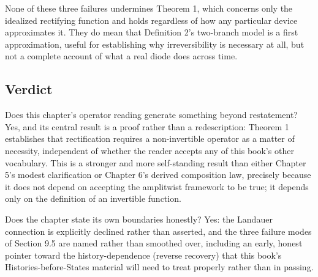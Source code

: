 \documentclass[12pt]{article}
\begin{document}
None of these three failures undermines Theorem 1, which concerns only the idealized rectifying function and holds regardless of how any particular device approximates it. They do mean that Definition 2's two-branch model is a first approximation, useful for establishing why irreversibility is necessary at all, but not a complete account of what a real diode does across time.

\subsection{Verdict}

Does this chapter's operator reading generate something beyond restatement? Yes, and its central result is a proof rather than a redescription: Theorem 1 establishes that rectification requires a non-invertible operator as a matter of necessity, independent of whether the reader accepts any of this book's other vocabulary. This is a stronger and more self-standing result than either Chapter 5's modest clarification or Chapter 6's derived composition law, precisely because it does not depend on accepting the amplitwist framework to be true; it depends only on the definition of an invertible function.

Does the chapter state its own boundaries honestly? Yes: the Landauer connection is explicitly declined rather than asserted, and the three failure modes of Section 9.5 are named rather than smoothed over, including an early, honest pointer toward the history-dependence (reverse recovery) that this book's Histories-before-States material will need to treat properly rather than in passing.
\end{document}
